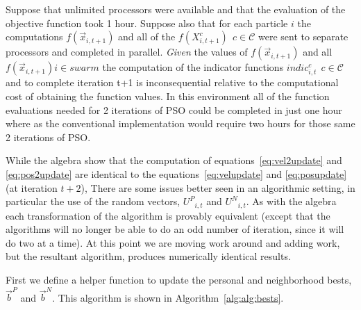 \documentclass[journal,letterpaper]{IEEEtran}
\newcommand{\alg}[1]{Algorithm~\ref{alg:#1}}
\providecommand{\pers}{\ensuremath{P}}
\providecommand{\neigh}{\ensuremath{N}}
\providecommand{\nURand}{\ensuremath{U^\neigh}}
\providecommand{\pURand}{\ensuremath{U^\pers}}
\providecommand{\ppos}{\ensuremath{\Vec{x}}}
\providecommand{\nbest}{\ensuremath{\Vec{b}^\neigh}}
\providecommand{\pbest}{\ensuremath{\Vec{b}^\pers}}
\providecommand{\ofunc}{\ensuremath{f}}
\providecommand{\swarm}{\ensuremath{swarm}}
\providecommand{\specpos}{\ensuremath{X}}
\providecommand{\caseset}{\ensuremath{\mathcal{C}}}
\begin{document}
Suppose that unlimited processors were available and that the evaluation of 
the objective function took 1 hour. Suppose also that for each particle $i$ 
the computations
$\ofunc(\ppos_{i,t+1})$ and all 
of the $\ofunc(\specpos_{i,t+1}^{c}) \ \ c \in \caseset$ were sent to separate
processors and completed in parallel.
\emph{Given} the values 
of $\ofunc(\ppos_{i,t+1})$ and all 
$\ofunc(\ppos_{i,t+1}) i \in \swarm$ 
the computation of the indicator functions $indic_{i,t}^{c} \ \ c \in \caseset$ and to complete iteration t+1
is inconsequential relative to the computational cost of obtaining the function values. 
In this environment all of the function evaluations needed for 2 iterations of PSO
could be completed in just one hour where as the conventional implementation would
require two hours for those same 2 iterations of PSO.

While the algebra show that the computation of 
equations~\eqref{eq:vel2update} and \eqref{eq:pos2update} are identical to the 
equations~\eqref{eq:velupdate} and \eqref{eq:posupdate} (at iteration $t+2$),
There are some issues better seen in an algorithmic setting, in particular the use of the random
vectors, 
$\pURand_{i,t}$ and $\nURand_{i,t}$. As with the algebra each transformation of the algorithm is
provably equivalent (except that the algorithms will no longer be able to do an odd number of iteration,
since it will do two at a time). At this point we are moving work around and adding work, but the
resultant algorithm, produces numerically identical results.

First we define a helper function to update the personal and neighborhood bests, $\pbest$ and $\nbest$.
This algorithm is shown in \alg{alg:bests}.
\end{document}
